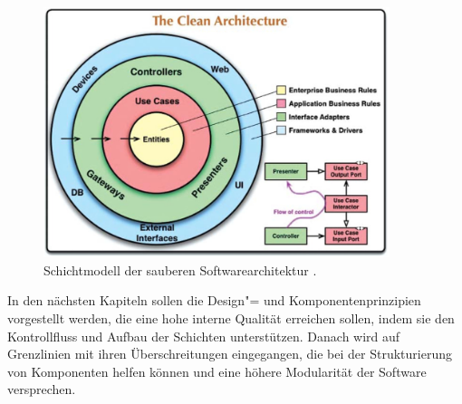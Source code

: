 \begin{figure}
  \centering
  \includegraphics[width=0.9\textwidth]{res/clean_architecture.jpg}
   \caption{Schichtmodell der sauberen Softwarearchitektur \citep[][203]{martin2018}.}
   \label{fig:clean_architecture}
\end{figure}


In den nächsten Kapiteln sollen die Design"= und Komponentenprinzipien vorgestellt werden, die eine hohe interne Qualität erreichen sollen, indem sie den  Kontrollfluss und Aufbau der Schichten unterstützen. Danach wird auf Grenzlinien mit ihren Überschreitungen eingegangen, die bei der Strukturierung von Komponenten helfen können und eine höhere Modularität der Software versprechen. 








